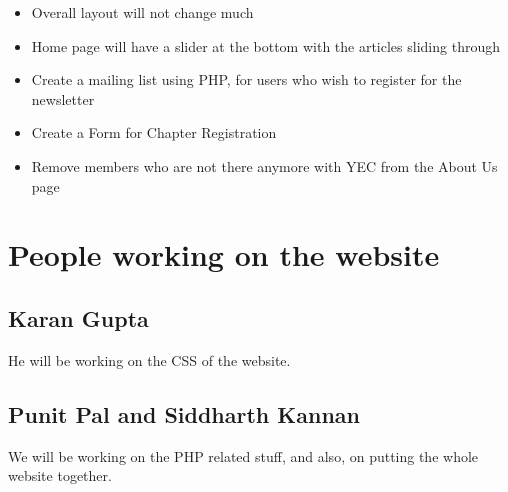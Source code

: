 \documentclass[a4paper, 11pt]{article}
\begin{document}
\begin{itemize}
\item{Overall layout will not change much}
\item{Home page will have a slider at the bottom with the articles sliding through}
\item{Create a mailing list using PHP, for users who wish to register for the newsletter}
\item{Create a Form for Chapter Registration}
\item{Remove members who are not there anymore with YEC from the About Us page}
\end{itemize}

\section{People working on the website}

\subsection{Karan Gupta}

He will be working on the CSS of the website.

\subsection{Punit Pal and Siddharth Kannan}

We will be working on the PHP related stuff, and also, on putting the whole website together.
\end{document}
